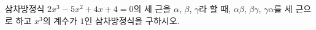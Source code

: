 삼차방정식 $2x^3-5x^2+4x+4=0$의 세 근을 $\alpha$, $\beta$, $\gamma$라 할 때, $\alpha\beta$, $\beta\gamma$, $\gamma\alpha$를 세 근으로 하고 $x^3$의 계수가 $1$인 삼차방정식을 구하시오.
